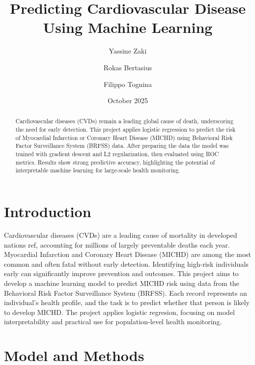 \documentclass[10pt,conference,compsocconf]{IEEEtran}
\title{\textbf{Predicting Cardiovascular Disease Using Machine Learning}}
\author{Yassine Zaki \and Rokas Bertasius \and Filippo Tognina}
\date{October 2025}
\begin{document}
\maketitle

\begin{abstract}
Cardiovascular diseases (CVDs) remain a leading global cause of death, underscoring the need for early detection. This project applies logistic regression to predict the risk of Myocardial Infarction or Coronary Heart Disease (MICHD) using Behavioral Risk Factor Surveillance System (BRFSS) data. After preparing the data the model was trained with gradient descent and L2 regularization, then evaluated using ROC metrics. Results show strong predictive accuracy, highlighting the potential of interpretable machine learning for large-scale health monitoring.
\end{abstract}

\section{Introduction}
Cardiovascular diseases (CVDs) are a leading cause of mortality in developed nations {ref}, accounting for millions of largely preventable deaths each year. Myocardial Infarction and Coronary Heart Disease (MICHD) are among the most common and often fatal without early detection. Identifying high-risk individuals early can significantly improve prevention and outcomes.
This project aims to develop a machine learning model to predict MICHD risk using data from the Behavioral Risk Factor Surveillance System (BRFSS). Each record represents an individual’s health profile, and the task is to predict whether that person is likely to develop MICHD. The project applies logistic regresion, focusing on model interpretability and practical use for population-level health monitoring.

\section{Model and Methods}
\end{document}
